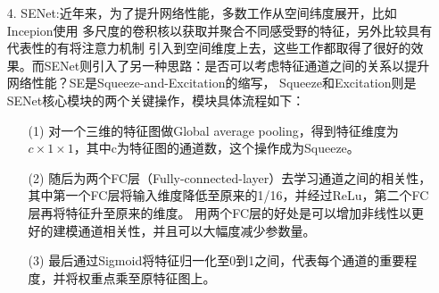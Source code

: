 \begin{itemize}

\item [4.]SENet:近年来，为了提升网络性能，多数工作从空间纬度展开，比如Incepion使用
多尺度的卷积核以获取并聚合不同感受野的特征，另外比较具有代表性的有将注意力机制
引入到空间维度上去，这些工作都取得了很好的效果。而SENet则引入了另一种思路：是否可以考虑特征通道之间的关系以提升网络性能？SE是Squeeze-and-Excitation的缩写，
Squeeze和Excitation则是SENet核心模块的两个关键操作，模块具体流程如下：
\begin{itemize}
  \item [(1)] 对一个三维的特征图做Global average pooling，得到特征维度为${c\times1\times1}$，其中c为特征图的通道数，这个操作成为Squeeze。
  \item [(2)] 随后为两个FC层（Fully-connected-layer）去学习通道之间的相关性，其中第一个FC层将输入维度降低至原来的1/16，并经过ReLu，第二个FC层再将特征升至原来的维度。
  用两个FC层的好处是可以增加非线性以更好的建模通道相关性，并且可以大幅度减少参数量。
  \item [(3)] 最后通过Sigmoid将特征归一化至0到1之间，代表每个通道的重要程度，并将权重点乘至原特征图上。
\end{itemize}
\end{itemize}


